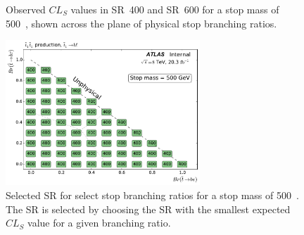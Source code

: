 \begin{figure}[ht]
  \centering
  \caption{
    Observed $CL_S$ values in SR~400 and SR~600 for a stop mass of 500~\GeV,
    shown across the plane of physical stop branching ratios.
  }
\end{figure}

\begin{figure}[ht]
  \centering
  \includegraphics[width=0.65\textwidth]
    {figs/blstop/region_selection/region_choice_vs_br_m_500.pdf}
  \caption{
    Selected SR for select stop branching ratios for a stop mass of 500~\GeV.
    The SR is selected by choosing the SR with the smallest expected $CL_S$
    value for a given branching ratio.
  }
\end{figure}

